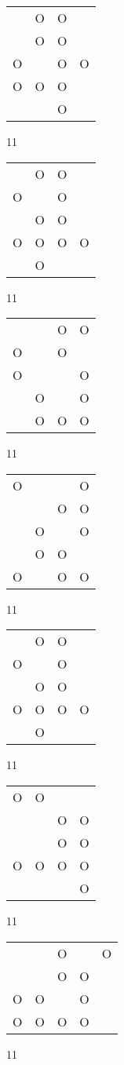 \begin{tabular}{|m{0.2cm}m{0.2cm}m{0.2cm}m{0.2cm}|}\hline
 &O&O& \\
 &O&O& \\
O& &O&O\\
O&O&O& \\
 & &O& \\
\hline\end{tabular}11
\begin{tabular}{|m{0.2cm}m{0.2cm}m{0.2cm}m{0.2cm}|}\hline
 &O&O& \\
O& &O& \\
 &O&O& \\
O&O&O&O\\
 &O& & \\
\hline\end{tabular}11
\begin{tabular}{|m{0.2cm}m{0.2cm}m{0.2cm}m{0.2cm}|}\hline
 & &O&O\\
O& &O& \\
O& & &O\\
 &O& &O\\
 &O&O&O\\
\hline\end{tabular}11
\begin{tabular}{|m{0.2cm}m{0.2cm}m{0.2cm}m{0.2cm}|}\hline
O& & &O\\
 & &O&O\\
 &O& &O\\
 &O&O& \\
O& &O&O\\
\hline\end{tabular}11
\begin{tabular}{|m{0.2cm}m{0.2cm}m{0.2cm}m{0.2cm}|}\hline
 &O&O& \\
O& &O& \\
 &O&O& \\
O&O&O&O\\
 &O& & \\
\hline\end{tabular}11
\begin{tabular}{|m{0.2cm}m{0.2cm}m{0.2cm}m{0.2cm}|}\hline
O&O& & \\
 & &O&O\\
 & &O&O\\
O&O&O&O\\
 & & &O\\
\hline\end{tabular}11
\begin{tabular}{|m{0.2cm}m{0.2cm}m{0.2cm}m{0.2cm}m{0.2cm}|}\hline
 & &O& &O\\
 & &O&O& \\
O&O& &O& \\
O&O&O&O& \\
\hline\end{tabular}11

